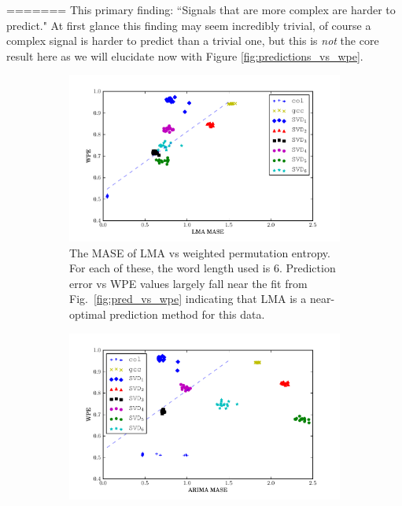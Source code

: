 \documentclass{article}
\begin{document}
=======
This primary finding: ``Signals that are more complex are harder to predict." At
first glance this finding may seem incredibly trivial, of course a complex
signal is harder to predict than a trivial one, but this is \emph{not} the core
result here as we will elucidate now with Figure \ref{fig:predictions_vs_wpe}.
\begin{figure}[htbp]
  \centering
  \begin{subfigure}[t]{0.5\textwidth}
    \includegraphics[width=1.0\textwidth]{figs/LMA_prediction_vs_entropy}
    \caption{The MASE of LMA vs weighted permutation entropy. For each of these,
    the word length used is $6$. Prediction error vs WPE values largely fall
    near the fit from Fig.~\ref{fig:pred_vs_wpe} indicating that LMA is a near-
    optimal prediction method for this data.}
    \label{fig:lma_pred_vs_wpe}
  \end{subfigure}%
  \begin{subfigure}[t]{0.5\textwidth}
    \includegraphics[width=1.0\textwidth]{figs/ARIMA_prediction_vs_entropy}

\end{subfigure}
\end{figure}
\end{document}
